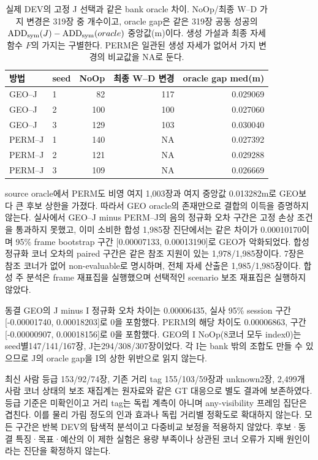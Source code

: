 \begin{table}[t]\centering\small\caption{실제 DEV의 고정 J 선택과 같은 bank oracle 차이. NoOp/최종 W--D 가지 변경은 319장 중 개수이고, oracle gap은 같은 319장 공동 성공의 $\mathrm{ADD}_{\rm sym}(J)-\mathrm{ADD}_{\rm sym}(oracle)$ 중앙값(m)이다. 생성 가설과 최종 자세 함수 $F$의 가지는 구별한다. PERM은 일관된 생성 자세가 없어서 가지 변경의 비교값을 NA로 둔다.}\label{sup:joint_action_selection}\begin{tabular}{llrrr}\toprule 방법 & seed & NoOp & 최종 W--D 변경 & oracle gap med(m) \\\midrule

GEO--J & 1 & 82 & 117 & 0.029069\\

GEO--J & 2 & 100 & 100 & 0.027060\\

GEO--J & 3 & 129 & 103 & 0.030040\\

PERM--J & 1 & 140 & NA & 0.027392\\

PERM--J & 2 & 121 & NA & 0.029288\\

PERM--J & 3 & 109 & NA & 0.026669\\

\bottomrule\end{tabular}\end{table}

source oracle에서 PERM도 비영 여지 1,003장과 여지 중앙값 0.013282m로 GEO보다 큰 후보 상한을 가졌다. 따라서 GEO oracle의 존재만으로 결합의 이득을 증명하지 않는다. 실사에서 GEO--J minus PERM--J의 음의 정규화 오차 구간은 고정 손상 조건을 통과하지 못했고, 이미 소비한 합성 1,985장 진단에서는 같은 차이가 0.00010170이며 95\% frame bootstrap 구간 [0.00007133, 0.00013190]로 GEO가 악화되었다. 합성 정규화 코너 오차의 paired 구간은 같은 참조 지원이 있는 1,978/1,985장이다. 7장은 참조 코너가 없어 non-evaluable로 명시하며, 전체 자세 산출은 1,985/1,985장이다. 합성 주 분석은 frame 재표집을 실행했으며 선택적인 scenario 보조 재표집은 실행하지 않았다.

동결 GEO의 J minus I 정규화 오차 차이는 0.00006435, 실사 95\% session 구간 [-0.00001740, 0.00018203]로 0을 포함했다. PERM의 해당 차이도 0.00006863, 구간 [-0.00000907, 0.00018156]로 0을 포함했다. GEO의 I NoOp(8코너 모두 index0)는 seed별147/141/167장, J는294/308/307장이었다. 각 I는 bank 밖의 조합도 만들 수 있으므로 J의 oracle gap을 I의 상한 위반으로 읽지 않는다.

최신 사람 등급 153/92/74장, 기존 거리 tag 155/103/59장과 unknown2장, 2,499개 사람 코너 상태의 보조 재집계는 원자료와 같은 GT 대응으로 별도 결과에 보존하였다. 등급 기준은 미확인이고 거리 tag는 독립 계측이 아니며 any-visibility 프레임 집단은 겹친다. 이를 물리 가림 정도의 인과 효과나 독립 거리별 정확도로 확대하지 않는다. 모든 구간은 반복 DEV의 탐색적 분석이고 다중비교 보정을 적용하지 않았다. 후보·동결 특징·목표·예산의 이 제한 실험은 용량 부족이나 상관된 코너 오류가 지배 원인이라는 진단을 확정하지 않는다.
